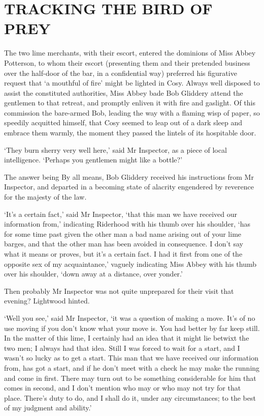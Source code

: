 
\chapter{TRACKING THE BIRD OF PREY}

The two lime merchants, with their escort, entered the dominions of
Miss Abbey Potterson, to whom their escort (presenting them and their
pretended business over the half-door of the bar, in a confidential
way) preferred his figurative request that ‘a mouthful of fire’ might
be lighted in Cosy. Always well disposed to assist the constituted
authorities, Miss Abbey bade Bob Gliddery attend the gentlemen to
that retreat, and promptly enliven it with fire and gaslight. Of this
commission the bare-armed Bob, leading the way with a flaming wisp of
paper, so speedily acquitted himself, that Cosy seemed to leap out of a
dark sleep and embrace them warmly, the moment they passed the lintels
of its hospitable door.

‘They burn sherry very well here,’ said Mr Inspector, as a piece of
local intelligence. ‘Perhaps you gentlemen might like a bottle?’

The answer being By all means, Bob Gliddery received his instructions
from Mr Inspector, and departed in a becoming state of alacrity
engendered by reverence for the majesty of the law.

‘It’s a certain fact,’ said Mr Inspector, ‘that this man we have
received our information from,’ indicating Riderhood with his thumb over
his shoulder, ‘has for some time past given the other man a bad name
arising out of your lime barges, and that the other man has been avoided
in consequence. I don’t say what it means or proves, but it’s a certain
fact. I had it first from one of the opposite sex of my acquaintance,’
vaguely indicating Miss Abbey with his thumb over his shoulder, ‘down
away at a distance, over yonder.’

Then probably Mr Inspector was not quite unprepared for their visit that
evening? Lightwood hinted.

‘Well you see,’ said Mr Inspector, ‘it was a question of making a move.
It’s of no use moving if you don’t know what your move is. You had
better by far keep still. In the matter of this lime, I certainly had
an idea that it might lie betwixt the two men; I always had that idea.
Still I was forced to wait for a start, and I wasn’t so lucky as to get
a start. This man that we have received our information from, has got
a start, and if he don’t meet with a check he may make the running and
come in first. There may turn out to be something considerable for him
that comes in second, and I don’t mention who may or who may not try
for that place. There’s duty to do, and I shall do it, under any
circumstances; to the best of my judgment and ability.’

